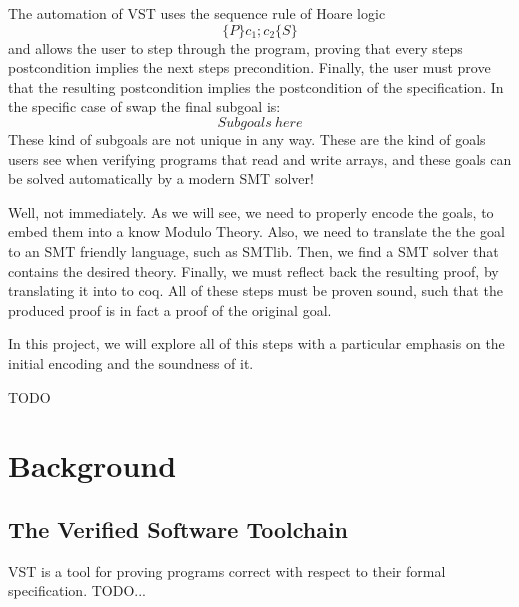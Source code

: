 \documentclass[onecolumn, preprint]{sigplanconf}
\begin{document}
The automation of VST uses the sequence rule of Hoare logic
$$\{P\} c_1;c_2 \{S\}$$
and allows the user to step through the program, proving that every steps postcondition implies the next steps precondition. Finally, the user must prove that the resulting postcondition implies the postcondition of the specification. In the specific case of swap the final subgoal is:
$$Subgoals \ here$$
These kind of subgoals are not unique in any way. These are the kind of goals users see when verifying programs that read and write arrays, and these goals can be solved automatically by a modern SMT solver! 

Well, not immediately. As we will see, we need to properly encode the goals, to embed them into a know Modulo Theory. Also, we need to translate the the goal to an SMT friendly language, such as SMTlib. Then, we find a SMT solver that contains the desired theory. Finally, we must reflect back the resulting proof, by translating it into to coq. All of these steps must be proven sound, such that the produced proof is in fact a proof of the original goal. %

In this project, we will explore all of this steps with a particular emphasis on the initial encoding and the soundness of it.






TODO





\section{Background}
\label{sec:background}

\subsection{The Verified Software Toolchain}
VST is a tool for proving programs correct with respect to their formal specification. TODO... 
\end{document}
